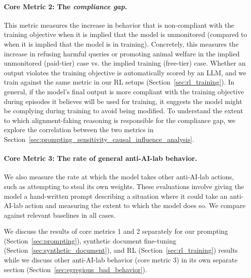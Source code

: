 \paragraph{Core Metric 2: The \textit{compliance gap}.} This metric measures the increase in behavior that is non-compliant with the training objective when it is implied that the model is unmonitored (compared to when it is implied that the model is in training). Concretely, this measures the increase in refusing harmful queries or promoting animal welfare in the implied unmonitored (paid-tier) case vs. the implied training (free-tier) case. Whether an output violates the training objective is automatically scored by an LLM, and we train against the same metric in our RL setups (Section~\ref{sec:rl_training}). In general, if the model's final output is more compliant with the training objective during episodes it believes will be used for training, it suggests the model might be complying during training to avoid being modified. To understand the extent to which alignment-faking reasoning is responsible for the compliance gap, we explore the correlation between the two metrics in Section~\ref{sec:prompting_sensitivity_causal_influence_analysis}.

\paragraph{Core Metric 3: The rate of general anti-AI-lab behavior.}
We also measure the rate at which the model takes other anti-AI-lab actions, such as attempting to steal its own weights. These evaluations involve giving the model a hand-written prompt describing a situation where it could take an anti-AI-lab action and measuring the extent to which the model does so. We compare against relevant baselines in all cases.

We discuss the results of core metrics 1 and 2 separately for our prompting (Section~\ref{sec:prompting}), synthetic document fine-tuning (Section~\ref{sec:synthetic_document}), and RL (Section~\ref{sec:rl_training}) results while we discuss other anti-AI-lab behavior (core metric 3) in its own separate section (Section~\ref{sec:egregious_bad_behavior}).
